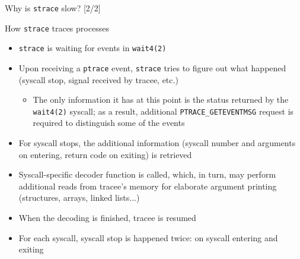 \documentclass[unicode]{beamer}
\begin{document}
\begin{frame}{Why is \texttt{strace} slow? \hfill [2/2]}
\begin{block}{\large How \texttt{strace} traces processes}
\begin{itemize}
  \item \texttt{strace} is waiting for events in \texttt{wait4(2)}
  \item Upon receiving a \texttt{ptrace} event, \texttt{strace} tries to figure
        out what happened (syscall stop, signal received by tracee, etc.)
  \begin{itemize}
    \item The only information it has at this point is the status returned
          by the \texttt{wait4(2)} syscall; as a result, additional
	  \texttt{PTRACE\_GETEVENTMSG} request is required to distinguish
	  some of the events
  \end{itemize}
  \item For syscall stops, the additional information (syscall number and
        arguments on entering, return code on exiting) is retrieved
  \item Syscall-specific decoder function is called, which, in turn, may perform
        additional reads from tracee's memory for elaborate argument printing
	(structures, arrays, linked lists...)
  \item When the decoding is finished, tracee is resumed
  \item For each syscall, syscall stop is happened twice: on syscall entering
        and exiting
\end{itemize}
\end{block}
\end{frame}

\end{document}
